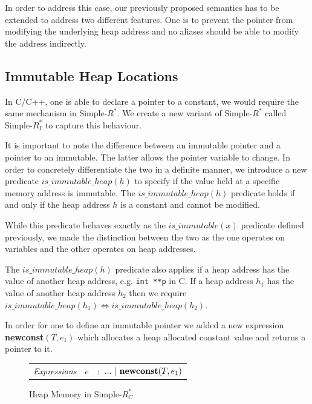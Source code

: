 \documentclass[a4paper,12pt]{report}
\begin{document}
\par
In order to address this case, our previously proposed semantics has to be 
extended to address two different features. One is to prevent the pointer from 
modifying the underlying heap address and no aliases should be able to modify 
the address indirectly.

\subsection{Immutable Heap Locations}
In C/C++, one is able to declare a pointer to a constant, we would require 
the same mechanism in Simple-$R^{*}$. We create a new variant of Simple-$R^{*}$ 
called Simple-$R^{*}_{I}$ to capture this behaviour. 

\par
It is important to note the 
difference between an immutable pointer and a pointer 
to an immutable. The latter allows the pointer variable to change. In order to 
concretely differentiate the two in a definite manner, we introduce 
a new predicate $is\_immutable\_heap(h)$ to specify if the value held at a 
specific memory address is immutable. The $is\_immutable\_heap(h)$ predicate 
holds if and only if the heap address $h$ is a constant and cannot be modified.

\par
While this predicate behaves exactly as the $is\_immutable(x)$ predicate defined 
previously, we made the distinction between the two as the one operates on variables 
and the other operates on heap addresses. 

\par 
The $is\_immutable\_heap(h)$ predicate also applies if a heap address has the value of 
another heap address, e.g. \verb|int **p| in C. If a heap address $h_1$ has the 
value of another heap address $h_2$ then we require $is\_immutable\_heap(h_1) \Leftrightarrow 
is\_immutable\_heap(h_2)$.  

\par
In order for one to define an immutable pointer we added a new expression 
\textbf{newconst}$(T, e_1)$ which allocates a heap allocated constant value and 
returns a pointer to it. 

\begin{figure}[H]
  \begin{center}
    \begin{tabular} {l l l}      
      \textit{Expressions} & $e$& $:$ $...\text{ }|\text{ \textbf{newconst}}(T, e_1)$ \\
    \end{tabular}
  \end{center}
  \caption{Heap Memory in Simple-$R^{*}_{C}$}
\end{figure}
\end{document}

